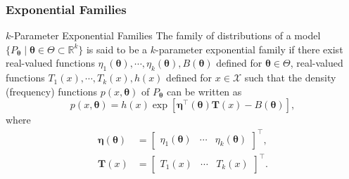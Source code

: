 \documentclass[serif,mathserif,professionalfont]{beamer}
\begin{document}
\begin{frame}
	
	\frametitle{Exponential Families}
	
	\begin{block}{$ k $-Parameter Exponential Families}
		The family of distributions of a model $ \{P_{\boldsymbol{\theta}} \; | \; \boldsymbol{\theta} \in \Theta \subset \mathbb{R}^k \} $ is said to be a $ k $-parameter exponential family if there exist real-valued functions $ \eta_1\left(\boldsymbol{\theta} \right), \cdots, \eta_k\left(\boldsymbol{\theta} \right), B\left(\boldsymbol{\theta} \right) $ defined for $ \boldsymbol{\theta} \in \Theta $, real-valued functions $ T_1\left(x \right), \cdots, T_k\left(x \right), h\left(x \right) $ defined for $ x \in \mathcal{X} $ such that the density (frequency) functions $ p\left(x, \boldsymbol{\theta} \right) $ of $ P_{\boldsymbol{\theta}} $ can be written as
		\begin{equation*}
		p\left(x, \boldsymbol{\theta} \right) = h\left(x \right) \exp \left[\boldsymbol{\eta}^\top\left(\boldsymbol{\theta} \right) \bm{T}\left(x \right) - B\left(\boldsymbol{\theta} \right)  \right],
		\end{equation*}
		where
		\begin{equation*}
		\begin{split}
		\boldsymbol{\eta}\left(\boldsymbol{\theta} \right) & =
		\begin{bmatrix} 
		\eta_1\left(\boldsymbol{\theta} \right) & \cdots & \eta_k\left(\boldsymbol{\theta} \right) \end{bmatrix}^\top, \\
		\bm{T}\left(x \right) & =
		\begin{bmatrix} 
		T_1\left(x \right) & \cdots & T_k\left(x \right) 
		\end{bmatrix}^\top.
		\end{split}
		\end{equation*}
	\end{block}
	
	
	
\end{frame}
\end{document}
